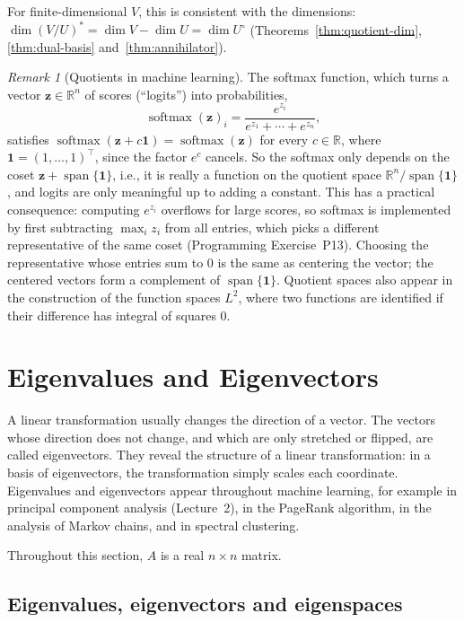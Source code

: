 \documentclass[11pt]{article}
\theoremstyle{definition}
\theoremstyle{plain}
\theoremstyle{remark}
\newtheorem{remark}[definition]{Remark}
\DeclareMathOperator{\Span}{span}
\begin{document}
For finite-dimensional $V$, this is consistent with the dimensions: $\dim (V/U)^* = \dim V - \dim U = \dim U^\circ$ (Theorems~\ref{thm:quotient-dim}, \ref{thm:dual-basis} and~\ref{thm:annihilator}).

\begin{remark}[Quotients in machine learning]
    The softmax function, which turns a vector $\mathbf{z} \in \mathbb{R}^n$ of scores (``logits'') into probabilities,
    \[\operatorname{softmax}(\mathbf{z})_i = \frac{e^{z_i}}{e^{z_1} + \cdots + e^{z_n}},\]
    satisfies $\operatorname{softmax}(\mathbf{z} + c\mathbf{1}) = \operatorname{softmax}(\mathbf{z})$ for every $c \in \mathbb{R}$, where $\mathbf{1} = (1, \ldots, 1)^\top$, since the factor $e^c$ cancels. So the softmax only depends on the coset $\mathbf{z} + \Span\{\mathbf{1}\}$, i.e., it is really a function on the quotient space $\mathbb{R}^n/\Span\{\mathbf{1}\}$, and logits are only meaningful up to adding a constant. This has a practical consequence: computing $e^{z_i}$ overflows for large scores, so softmax is implemented by first subtracting $\max_i z_i$ from all entries, which picks a different representative of the same coset (Programming Exercise~P13). Choosing the representative whose entries sum to $0$ is the same as centering the vector; the centered vectors form a complement of $\Span\{\mathbf{1}\}$. Quotient spaces also appear in the construction of the function spaces $L^2$, where two functions are identified if their difference has integral of squares $0$.
\end{remark}

\section{Eigenvalues and Eigenvectors}\label{sec:eigen}

A linear transformation usually changes the direction of a vector. The vectors whose direction does not change, and which are only stretched or flipped, are called eigenvectors. They reveal the structure of a linear transformation: in a basis of eigenvectors, the transformation simply scales each coordinate. Eigenvalues and eigenvectors appear throughout machine learning, for example in principal component analysis (Lecture~2), in the PageRank algorithm, in the analysis of Markov chains, and in spectral clustering.

Throughout this section, $A$ is a real $n \times n$ matrix.

\subsection{Eigenvalues, eigenvectors and eigenspaces}
\end{document}
